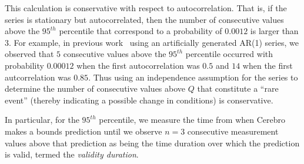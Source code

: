 This calculation is conservative with respect to autocorrelation.  That is, if
the series is stationary but autocorrelated, then the number of consecutive 
values above the $95^{th}$ percentile that correspond to a probability of
$0.0012$ is larger than $3$.  For example, in previous
work~\cite{Nurmi:2007:QQB:1791551.1791556} 
using an artificially generated AR(1) series, 
we observed that $5$ consecutive values above the $95^{th}$ percentile
occurred with probability $0.00012$ when the first autocorrelation was $0.5$
and $14$ when the first autcorrelation was $0.85$.  Thus using an independence
assumption for the series to determine the number of consecutive values above
$Q$ that constitute a ``rare event'' (thereby indicating a possible change in
conditions) is conservative.

In particular, for the $95^{th}$ percentile, we measure the time from when
Cerebro makes a bounds prediction until we observe $n=3$ consecutive
measurement values above that prediction as being the time duration over which
the prediction is valid, termed the \textit{validity duration}.  





